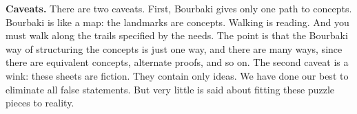 \textbf{Caveats.}
There are two caveats.
First, Bourbaki gives
only one path to concepts.
Bourbaki is like a map:
the landmarks are concepts.
Walking is reading.
And you must walk along the
trails specified by the needs.
The point is that the Bourbaki way
of structuring the concepts is just
one way, and there are many ways, since
there are equivalent concepts,
alternate proofs, and so on.
The second caveat is a wink:
these sheets are fiction.
They contain only ideas.
We have done our
best to eliminate all false statements.
But very little is said about
fitting these puzzle pieces to
reality.


\strats
